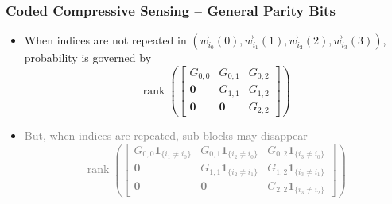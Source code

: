 \documentclass[10pt]{beamer}
\begin{document}
\begin{frame}
\frametitle{Coded Compressive Sensing -- General Parity Bits}
\begin{center}

\end{center}
\begin{itemize}
\item When indices are not repeated in $(\vec{w}_{i_0}(0), \vec{w}_{i_1}(1), \vec{w}_{i_2}(2), \vec{w}_{i_3}(3))$, probability is governed by
\begin{equation*}
\operatorname{rank}
\left(
\begin{bmatrix}
G_{0,0} & G_{0,1} & G_{0,2} \\
\mathbf{0} & G_{1,1} & G_{1,2} \\
\mathbf{0} & \mathbf{0}& G_{2,2}
\end{bmatrix}
\right)
\end{equation*}
\item \textcolor{gray}{But, when indices are repeated, sub-blocks may disappear
\begin{equation*}
\operatorname{rank}
\left(
\begin{bmatrix}
G_{0,0} \mathbf{1}_{\{ i_1 \neq i_0 \}} & G_{0,1} \mathbf{1}_{\{ i_2 \neq i_0 \}} & G_{0,2} \mathbf{1}_{\{ i_3 \neq i_0 \}} \\
\mathbf{0} & G_{1,1} \mathbf{1}_{\{ i_2 \neq i_1 \}} & G_{1,2} \mathbf{1}_{\{ i_3 \neq i_1 \}} \\
\mathbf{0} & \mathbf{0}& G_{2,2} \mathbf{1}_{\{ i_3 \neq i_2 \}}
\end{bmatrix}
\right)
\end{equation*}}
\end{itemize}
\end{frame}
\end{document}
